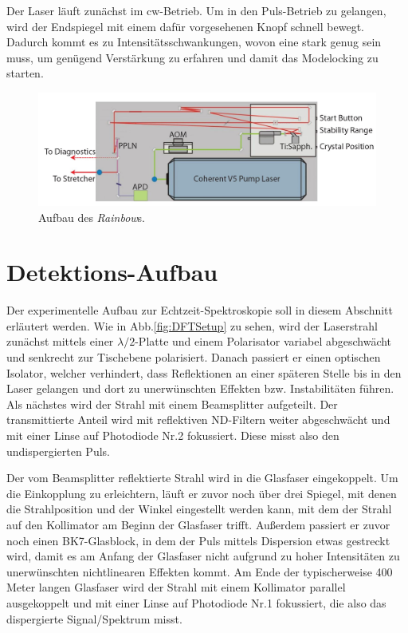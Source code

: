 \documentclass[bachelor,       %
               twoside,        %
               BCOR10mm,       %
               liststotoc,nomtotoc,bibtotoc, %
               english,ngerman, %
               final,          %
               ]{GAUBM}
\begin{document}
Der Laser läuft zunächst im cw-Betrieb.
Um in den Puls-Betrieb zu gelangen, wird der Endspiegel mit einem dafür vorgesehenen Knopf schnell bewegt.
Dadurch kommt es zu Intensitätsschwankungen, wovon eine stark genug sein muss, um genügend Verstärkung zu erfahren und damit das Modelocking zu starten.
\begin{figure}[!htb]
	\centering
	\includegraphics[width=\textwidth]{figures/rainbow2.JPG}
	\caption{Aufbau des \textit{Rainbow}s\protect\footnotemark.}
	\label{fig:rainbow}
\end{figure}
\section{Detektions-Aufbau}
Der experimentelle Aufbau zur Echtzeit-Spektroskopie soll in diesem Abschnitt erläutert werden.
Wie in Abb.\ref{fig:DFTSetup} zu sehen, wird der Laserstrahl zunächst mittels einer $\lambda/2$-Platte und einem Polarisator variabel abgeschwächt und senkrecht zur Tischebene polarisiert.
Danach passiert er einen optischen Isolator, welcher verhindert, dass Reflektionen an einer späteren Stelle bis in den Laser gelangen und dort zu unerwünschten Effekten bzw. Instabilitäten führen.
Als nächstes wird der Strahl mit einem Beamsplitter aufgeteilt.
Der transmittierte Anteil wird mit reflektiven ND-Filtern weiter abgeschwächt und mit einer Linse auf Photodiode Nr.2 fokussiert.
Diese misst also den undispergierten Puls.

Der vom Beamsplitter reflektierte Strahl wird in die Glasfaser eingekoppelt.
Um die Einkopplung zu erleichtern, läuft er zuvor noch über drei Spiegel, mit denen die Strahlposition und der Winkel eingestellt werden kann, mit dem der Strahl auf den Kollimator am Beginn der Glasfaser trifft.
Außerdem passiert er zuvor noch einen BK7-Glasblock, in dem der Puls mittels Dispersion etwas gestreckt wird, damit es am Anfang der Glasfaser nicht aufgrund zu hoher Intensitäten zu unerwünschten nichtlinearen Effekten kommt.
Am Ende der typischerweise 400 Meter langen Glasfaser wird der Strahl mit einem Kollimator parallel ausgekoppelt und mit einer Linse auf Photodiode Nr.1 fokussiert, die also das dispergierte Signal/Spektrum misst.
\end{document}
